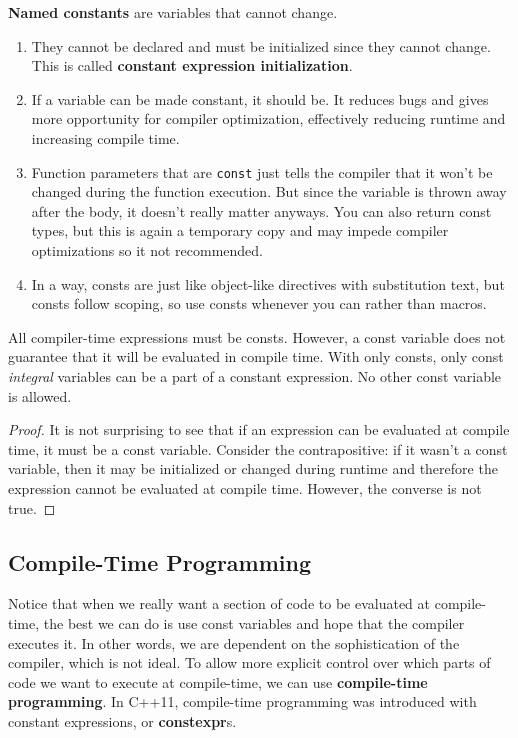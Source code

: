 \documentclass{article}
\begin{document}
    \begin{definition}
      \textbf{Named constants} are variables that cannot change. 
      \begin{enumerate}
        \item They cannot be declared and must be initialized since they cannot change. This is called \textbf{constant expression initialization}.
        \item If a variable can be made constant, it should be. It reduces bugs and gives more opportunity for compiler optimization, effectively reducing runtime and increasing compile time. 
        \item Function parameters that are \texttt{const} just tells the compiler that it won't be changed during the function execution. But since the variable is thrown away after the body, it doesn't really matter anyways. You can also return const types, but this is again a temporary copy and may impede compiler optimizations so it not recommended. 
        \item In a way, consts are just like object-like directives with substitution text, but consts follow scoping, so use consts whenever you can rather than macros. 
      \end{enumerate}
    \end{definition}

    \begin{theorem}
      All compiler-time expressions must be consts. However, a const variable does not guarantee that it will be evaluated in compile time. With only consts, only const \textit{integral} variables can be a part of a constant expression. No other const variable is allowed.
    \end{theorem}
    \begin{proof}
      It is not surprising to see that if an expression can be evaluated at compile time, it must be a const variable. Consider the contrapositive: if it wasn't a const variable, then it may be initialized or changed during runtime and therefore the expression cannot be evaluated at compile time. However, the converse is not true. 
    \end{proof}

  \subsection{Compile-Time Programming}  
    
    Notice that when we really want a section of code to be evaluated at compile-time, the best we can do is use const variables and hope that the compiler executes it. In other words, we are dependent on the sophistication of the compiler, which is not ideal. To allow more explicit control over which parts of code we want to execute at compile-time, we can use \textbf{compile-time programming}. In C++11, compile-time programming was introduced with constant expressions, or \textbf{constexpr}s.
\end{document}
